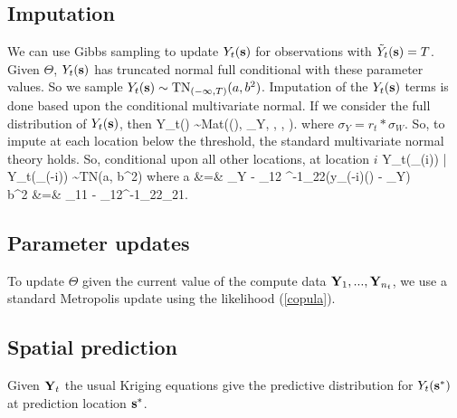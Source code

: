 \documentclass[11pt]{article}
\begin{document}
\subsection{Imputation}\label{s:impute}

We can use Gibbs sampling to update $Y_t(\mbox{\bf s})$ for observations with ${\tilde Y}_t(\mbox{\bf s})=T$.
Given $\Theta$, $Y_t(\mbox{\bf s})$ has truncated normal full conditional with these parameter values.
So we sample $Y_t(\mbox{\bf s})\sim\mbox{TN}_{(-\infty,T)}(a,b^2)$.
Imputation of the $Y_t(\mbox{\bf s})$ terms is done based upon the conditional multivariate normal. 
If we consider the full distribution of $Y_t(\mbox{\bf s})$, then
\beqn
	Y_t(\bs) \sim \mbox{Mat}(\mu(\bs), \sigma_Y, \rho, \nu, \alpha).
\eeqn
where $\sigma_Y = r_t * \sigma_W$.
So, to impute at each location below the threshold, the standard multivariate normal theory holds. 
So, conditional upon all other locations, at location $i$
\beqn
	Y_t(\bs_{(i)}) | Y_t(\bs_{(-i)}) \sim \mbox{TN}(a, b^2)
\eeqn
where
\beqn
	a 	&=& \mu_Y - \Sigma_{12} \Sigma^{-1}_{22}(y_{(-i)}(\bs) - \mu_Y)\\
	b^2	&=& \Sigma_{11} - \Sigma_{12}\Sigma^{-1}_{22}\Sigma_{21}.
\eeqn


\subsection{Parameter updates}
To update $\Theta$ given the current value of the compute data $\mbox{\bf Y}_1,...,\mbox{\bf Y}_{n_t}$, we use a standard Metropolis update using the likelihood (\ref{copula}).  

\subsection{Spatial prediction}
Given $\mbox{\bf Y}_t$ the usual Kriging equations give the predictive distribution for $Y_t(\mbox{\bf s}^*)$ at prediction location $\mbox{\bf s}^*$. 
\end{document}
